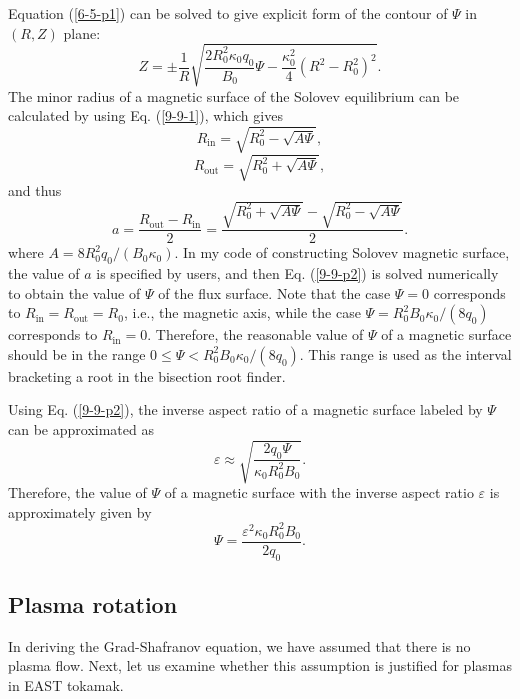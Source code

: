 \documentclass{llncs}
\newcommand{\tmop}[1]{\ensuremath{\operatorname{#1}}}
\begin{document}
Equation (\ref{6-5-p1}) can be solved to give explicit form of the contour of
$\Psi$ in $(R, Z)$ plane:
\begin{equation}
  \label{9-9-1} Z = \pm \frac{1}{R} \sqrt{\frac{2 R_0^2 \kappa_0 q_0}{B_0}
  \Psi - \frac{\kappa_0^2}{4} (R^2 - R_0^2)^2} .
\end{equation}
The minor radius of a magnetic surface of the Solovev equilibrium can be
calculated by using Eq. (\ref{9-9-1}), which gives
\begin{equation}
  R_{\tmop{in}} = \sqrt{R_0^2 - \sqrt{A \Psi}},
\end{equation}
\begin{equation}
  R_{\tmop{out}} = \sqrt{R_0^2 + \sqrt{A \Psi}},
\end{equation}
and thus
\begin{equation}
  \label{9-9-p2} a = \frac{R_{\tmop{out}} - R_{\tmop{in}}}{2} =
  \frac{\sqrt{R_0^2 + \sqrt{A \Psi}} - \sqrt{R_0^2 - \sqrt{A \Psi}}}{2} .
\end{equation}
where $A = 8 R_0^2 q_0 / (B_0 \kappa_0)$. In my code of constructing Solovev
magnetic surface, the value of $a$ is specified by users, and then Eq.
(\ref{9-9-p2}) is solved numerically to obtain the value of $\Psi$ of the flux
surface. Note that the case $\Psi = 0$ corresponds to $R_{\tmop{in}} =
R_{\tmop{out}} = R_0$, i.e., the magnetic axis, while the case $\Psi = R_0^2
B_0 \kappa_0 / (8 q_0)$ corresponds to $R_{\tmop{in}} = 0$. Therefore, the
reasonable value of $\Psi$ of a magnetic surface should be in the range $0
\leqslant \Psi < R_0^2 B_0 \kappa_0 / (8 q_0)$. This range is used as the
interval bracketing a root in the bisection root finder.

Using Eq. (\ref{9-9-p2}), the inverse aspect ratio of a magnetic surface
labeled by $\Psi$ can be approximated as{\cite{jardin2010}}
\begin{equation}
  \varepsilon \approx \sqrt{\frac{2 q_0 \Psi}{\kappa_0 R_0^2 B_0}} .
\end{equation}
Therefore, the value of $\Psi$ of a magnetic surface with the inverse aspect
ratio $\varepsilon$ is approximately given by
\begin{equation}
  \Psi = \frac{\varepsilon^2 \kappa_0 R_0^2 B_0}{2 q_0} .
\end{equation}
\subsection{Plasma rotation}\label{20-4-7-p2}

In deriving the Grad-Shafranov equation, we have assumed that there is no
plasma flow. Next, let us examine whether this assumption is justified for
plasmas in EAST tokamak.
\end{document}
